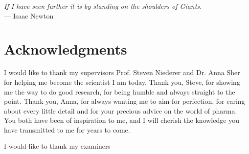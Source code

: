 
\begin{flushright}{\slshape
    If I have seen further it is by standing on the shoulders of Giants.} \\ \medskip
    --- Isaac Newton
\end{flushright}

\bigskip

\begingroup
\let\clearpage\relax
\let\cleardoublepage\relax
\let\cleardoublepage\relax
\chapter*{Acknowledgments}
I would like to thank my supervisors Prof. Steven Niederer and Dr. Anna Sher for helping me become the scientist I am today. Thank you, Steve, for showing me the way to do good research, for being humble and always straight to the point. Thank you, Anna, for always wanting me to aim for perfection, for caring about every little detail and for your precious advice on the world of pharma. You both have been of inspiration to me, and I will cherish the knowledge you have transmitted to me for years to come.

I would like to thank my examiners

\endgroup